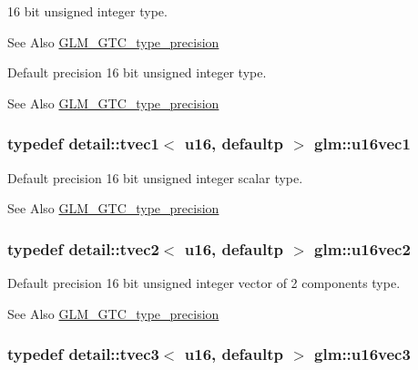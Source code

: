 16 bit unsigned integer type. \begin{DoxySeeAlso}{See Also}
\hyperlink{group__gtc__type__precision}{G\-L\-M\-\_\-\-G\-T\-C\-\_\-type\-\_\-precision}
\end{DoxySeeAlso}
Default precision 16 bit unsigned integer type. \begin{DoxySeeAlso}{See Also}
\hyperlink{group__gtc__type__precision}{G\-L\-M\-\_\-\-G\-T\-C\-\_\-type\-\_\-precision} 
\end{DoxySeeAlso}
\hypertarget{group__gtc__type__precision_ga95324b9d781c51a6d31b05fcc63c5cbe}{
\subsubsection[{u16vec1}]{\setlength{\rightskip}{0pt plus 5cm}typedef detail\-::tvec1$<$ u16, defaultp $>$ {\bf glm\-::u16vec1}}}\label{group__gtc__type__precision_ga95324b9d781c51a6d31b05fcc63c5cbe}
Default precision 16 bit unsigned integer scalar type. \begin{DoxySeeAlso}{See Also}
\hyperlink{group__gtc__type__precision}{G\-L\-M\-\_\-\-G\-T\-C\-\_\-type\-\_\-precision} 
\end{DoxySeeAlso}
\hypertarget{group__gtc__type__precision_ga4beac509930099bb494b4bd0a44c49f2}{
\subsubsection[{u16vec2}]{\setlength{\rightskip}{0pt plus 5cm}typedef detail\-::tvec2$<$ u16, defaultp $>$ {\bf glm\-::u16vec2}}}\label{group__gtc__type__precision_ga4beac509930099bb494b4bd0a44c49f2}
Default precision 16 bit unsigned integer vector of 2 components type. \begin{DoxySeeAlso}{See Also}
\hyperlink{group__gtc__type__precision}{G\-L\-M\-\_\-\-G\-T\-C\-\_\-type\-\_\-precision} 
\end{DoxySeeAlso}
\hypertarget{group__gtc__type__precision_ga372e1184da616b77fcbd48b8c166c24a}{
\subsubsection[{u16vec3}]{\setlength{\rightskip}{0pt plus 5cm}typedef detail\-::tvec3$<$ u16, defaultp $>$ {\bf glm\-::u16vec3}}}\label{group__gtc__type__precision_ga372e1184da616b77fcbd48b8c166c24a}
